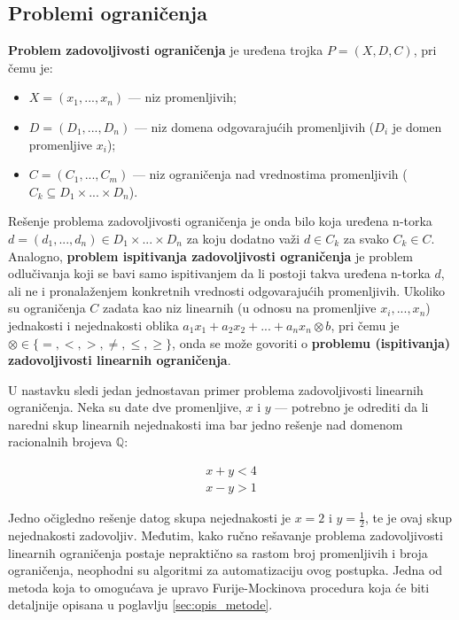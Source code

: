 \documentclass[a4paper,10pt]{article}
\begin{document}
\subsection{Problemi ograničenja}
\label{subsec:problemi_ogranicenja}

\textbf{Problem zadovoljivosti ograničenja} je uređena trojka $P = (X, D, C)$, pri čemu je:

\begin{itemize}
    \item $X = (x_1, ..., x_n)$ --- niz promenljivih;
    \item $D = (D_1, ..., D_n)$ --- niz domena odgovarajućih promenljivih ($D_i$ je domen promenljive $x_i$);
    \item $C = (C_1, ..., C_m)$ --- niz ograničenja nad vrednostima promenljivih ($C_k \subseteq D_1 \times ... \times D_n$).
\end{itemize}

Rešenje problema zadovoljivosti ograničenja je onda bilo koja uređena n-torka $d = (d_1, ..., d_n) \in  D_1 \times ... \times D_n$ za koju dodatno važi $d \in C_k$ za svako $C_k \in C$. Analogno, \textbf{problem ispitivanja zadovoljivosti ograničenja} je problem odlučivanja koji se bavi samo ispitivanjem da li postoji takva uređena n-torka $d$, ali ne i pronalaženjem konkretnih vrednosti odgovarajućih promenljivih. Ukoliko su ograničenja $C$ zadata kao niz linearnih (u odnosu na promenljive $x_i, ..., x_n$) jednakosti i nejednakosti oblika $a_1x_1 + a_2x_2 + ... + a_nx_n \otimes b$, pri čemu je $\otimes \in \{=, <, >, \ne, \le, \ge\}$, onda se može govoriti o \textbf{problemu (ispitivanja) zadovoljivosti linearnih ograničenja}.

U nastavku sledi jedan jednostavan primer problema zadovoljivosti linearnih ograničenja. Neka su date dve promenljive, $x$ i $y$ --- potrebno je odrediti da li naredni skup linearnih nejednakosti ima bar jedno rešenje nad domenom racionalnih brojeva $\mathbb{Q}$:

\begin{align*}
    x + y < 4 \\
    x - y > 1
\end{align*}

Jedno očigledno rešenje datog skupa nejednakosti je $x = 2$ i $y = \frac{1}{2}$, te je ovaj skup nejednakosti zadovoljiv. Međutim, kako ručno rešavanje problema zadovoljivosti linearnih ograničenja postaje nepraktično sa rastom broj promenljivih i broja ograničenja, neophodni su algoritmi za automatizaciju ovog postupka. Jedna od metoda koja to omogućava je upravo Furije-Mockinova procedura koja će biti detaljnije opisana u poglavlju \ref{sec:opis_metode}.
\end{document}
